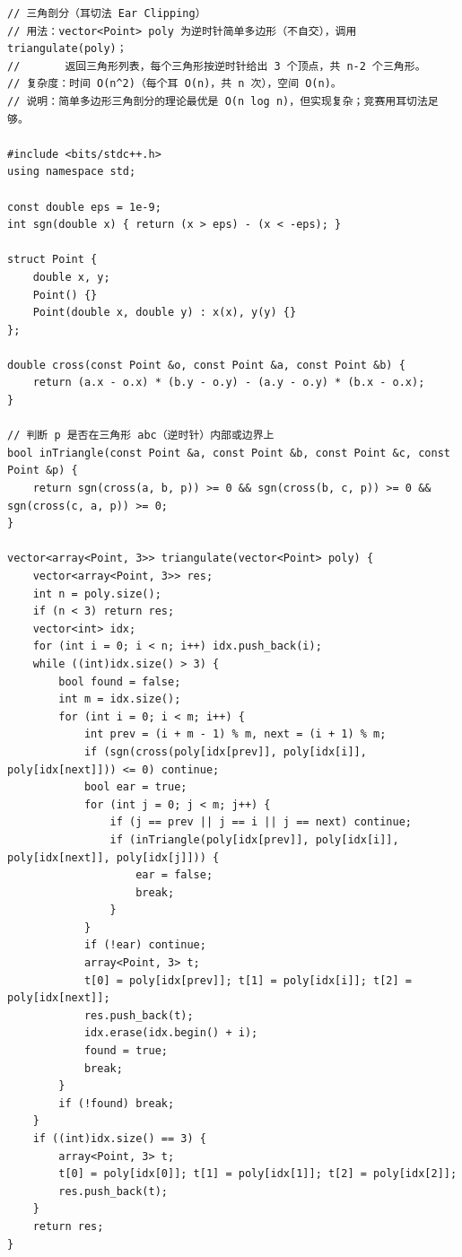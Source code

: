 \documentclass[11pt,a4paper]{ctexart}
\begin{document}
\begin{lstlisting}
// 三角剖分（耳切法 Ear Clipping）
// 用法：vector<Point> poly 为逆时针简单多边形（不自交），调用 triangulate(poly)；
//       返回三角形列表，每个三角形按逆时针给出 3 个顶点，共 n-2 个三角形。
// 复杂度：时间 O(n^2)（每个耳 O(n)，共 n 次），空间 O(n)。
// 说明：简单多边形三角剖分的理论最优是 O(n log n)，但实现复杂；竞赛用耳切法足够。

#include <bits/stdc++.h>
using namespace std;

const double eps = 1e-9;
int sgn(double x) { return (x > eps) - (x < -eps); }

struct Point {
    double x, y;
    Point() {}
    Point(double x, double y) : x(x), y(y) {}
};

double cross(const Point &o, const Point &a, const Point &b) {
    return (a.x - o.x) * (b.y - o.y) - (a.y - o.y) * (b.x - o.x);
}

// 判断 p 是否在三角形 abc（逆时针）内部或边界上
bool inTriangle(const Point &a, const Point &b, const Point &c, const Point &p) {
    return sgn(cross(a, b, p)) >= 0 && sgn(cross(b, c, p)) >= 0 && sgn(cross(c, a, p)) >= 0;
}

vector<array<Point, 3>> triangulate(vector<Point> poly) {
    vector<array<Point, 3>> res;
    int n = poly.size();
    if (n < 3) return res;
    vector<int> idx;
    for (int i = 0; i < n; i++) idx.push_back(i);
    while ((int)idx.size() > 3) {
        bool found = false;
        int m = idx.size();
        for (int i = 0; i < m; i++) {
            int prev = (i + m - 1) % m, next = (i + 1) % m;
            if (sgn(cross(poly[idx[prev]], poly[idx[i]], poly[idx[next]])) <= 0) continue;
            bool ear = true;
            for (int j = 0; j < m; j++) {
                if (j == prev || j == i || j == next) continue;
                if (inTriangle(poly[idx[prev]], poly[idx[i]], poly[idx[next]], poly[idx[j]])) {
                    ear = false;
                    break;
                }
            }
            if (!ear) continue;
            array<Point, 3> t;
            t[0] = poly[idx[prev]]; t[1] = poly[idx[i]]; t[2] = poly[idx[next]];
            res.push_back(t);
            idx.erase(idx.begin() + i);
            found = true;
            break;
        }
        if (!found) break;
    }
    if ((int)idx.size() == 3) {
        array<Point, 3> t;
        t[0] = poly[idx[0]]; t[1] = poly[idx[1]]; t[2] = poly[idx[2]];
        res.push_back(t);
    }
    return res;
}
\end{lstlisting}
\end{document}
